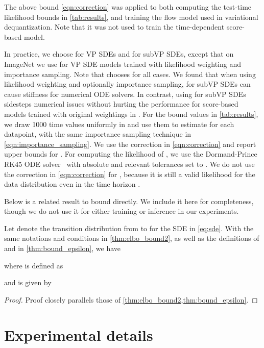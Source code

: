 The above bound \cref{eqn:correction} was applied to both computing the test-time likelihood bounds in \cref{tab:results}, and training the flow model used in variational dequantization. Note that it was not used to train the time-dependent score-based model.

In practice, we choose  for VP SDEs and  for subVP SDEs, except that on ImageNet we use  for VP SDE models trained with likelihood weighting and importance sampling. Note that \cite{song2020score} chooses  for all cases. We found that when using likelihood weighting and optionally importance sampling,  for subVP SDEs can cause stiffness for numerical ODE solvers. In contrast, using  for subVP SDEs sidesteps numerical issues without hurting the performance for score-based models trained with original weightings in \cite{song2020score}. For the bound values in \cref{tab:results}, we draw 1000 time values uniformly in  and use them to estimate  for each datapoint, with the same importance sampling technique in \cref{eqn:importance_sampling}. We use the correction in \cref{eqn:correction} and report upper bounds for . For computing the likelihood of , we use the Dormand-Prince RK45 ODE solver~\cite{dormand1980family} with absolute and relevant tolerances set to . We do not use the correction in \cref{eqn:correction} for , because it is still a valid likelihood for the data distribution even in the time horizon .

Below is a related result to bound  directly. We include it here for completeness, though we do not use it for either training or inference in our experiments.
\begin{theorem}\label{thm:bound_epsilon_2}
Let  denote the transition distribution from  to  for the SDE in \cref{eq:sde}. With the same notations and conditions in \cref{thm:elbo_bound2}, as well as the definitions of  and  in \cref{thm:bound_epsilon}, we have

where  is defined as

and  is given by
\begin{small}

\end{small}
\end{theorem}
\begin{proof}
Proof closely parallels those of \cref{thm:elbo_bound2,thm:bound_epsilon}.
\end{proof}

\section{Experimental details}\label{app:exp}
